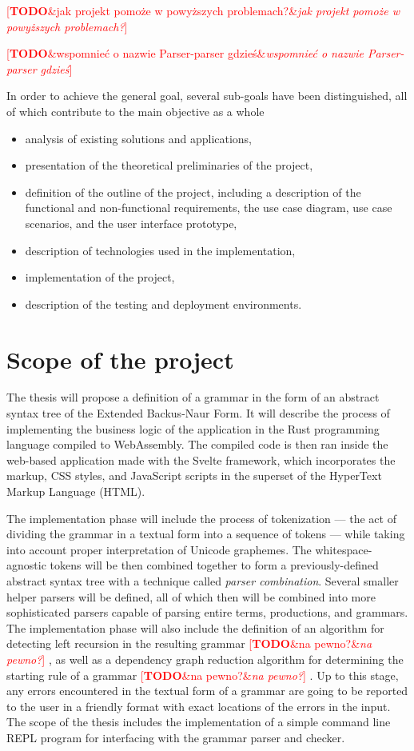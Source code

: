 \documentclass[english,engineering]{wizthesis}
\newcommand{\todo}[1]{%
  \textcolor{red}{[\textbf{TODO}\ifx&#1&{}\else{ }\fi\emph{#1}]}%
}
\newcommand{\thisproject}{Parser-parser}
\begin{document}
\todo{jak projekt pomoże w powyższych problemach?}

\todo{wspomnieć o nazwie \thisproject{} gdzieś}

In order to achieve the general goal, several sub-goals have been
distinguished, all of which contribute to the main objective as a whole
\begin{itemize}
  \item analysis of existing solutions and applications,
  \item presentation of the theoretical preliminaries of the project,
  \item definition of the outline of the project, including a description of the
  functional and non-functional requirements, the use case diagram, use case
  scenarios, and the user interface prototype,
  \item description of technologies used in the implementation,
  \item implementation of the project,
  \item description of the testing and deployment environments.
\end{itemize}

\section{Scope of the project}

The thesis will propose a definition of a grammar in the form of an abstract
syntax tree of the Extended Backus-Naur Form. It will describe the process of
implementing the business logic of the application in the Rust programming
language compiled to WebAssembly. The compiled code is then ran inside the
web-based application made with the Svelte framework, which incorporates the
markup, CSS styles, and JavaScript scripts in the superset of the HyperText
Markup Language (HTML).

The implementation phase will include the process of tokenization --- the act of
dividing the grammar in a textual form into a sequence of tokens --- while
taking into account proper interpretation of Unicode graphemes. The
whitespace-agnostic tokens will be then combined together to form a
previously-defined abstract syntax tree with a technique called \emph{parser
combination}. Several smaller helper parsers will be defined, all of which then
will be combined into more sophisticated parsers capable of parsing entire
terms, productions, and grammars. The implementation phase will also include the
definition of an algorithm for detecting left recursion in the resulting grammar
\todo{na pewno?}, as well as a dependency graph reduction algorithm for
determining the starting rule of a grammar \todo{na pewno?}. Up to this stage,
any errors encountered in the textual form of a grammar are going to be reported
to the user in a friendly format with exact locations of the errors in the
input. The scope of the thesis includes the implementation of a simple command
line REPL program for interfacing with the grammar parser and checker.
\end{document}
